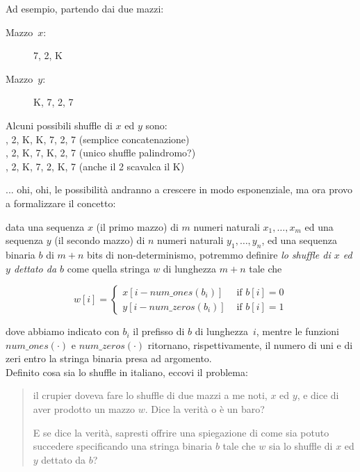   \begin{minipage}[t]{.40\textwidth}
    Ad esempio, partendo dai due mazzi:
    \begin{description}
      \item[{\sc Mazzo~$x$:}] 7, 2, K
      \vspace{-2mm}
      \item[{\sc Mazzo~$y$:}] K, 7, 2, 7
    \end{description}
  \end{minipage}%
\hspace{16.0mm}%
  \begin{minipage}[t]{.45\textwidth} 
    Alcuni possibili shuffle di $x$ ed $y$ sono:\\
    , 2, K, K, 7, 2, 7 (semplice concatenazione)\\
    , 2, K, 7, K, 2, 7 (unico shuffle palindromo?)\\
    , 2, K, 7, 2, K, 7 (anche il 2 scavalca il K)\\
  \end{minipage}

... ohi, ohi, le possibilità andranno a crescere in modo esponenziale,
ma ora provo a formalizzare il concetto:

data una sequenza $x$ (il primo mazzo)
di $m$ numeri naturali $x_1, \ldots, x_m$
ed una sequenza $y$ (il secondo mazzo)
di $n$ numeri naturali $y_1, \ldots, y_n$,
ed una sequenza binaria $b$ di $m+n$ bits di non-determinismo,
potremmo definire \emph{lo shuffle di $x$ ed $y$ dettato da $b$}
come quella stringa $w$ di lunghezza $m+n$ tale che

\[
w[i] = \left\{
         \begin{array}{ll}
          x[i- num\_ones(b_i)] & \mbox{ if $b[i]=0$} \\
          y[i- num\_zeros(b_i)] & \mbox{ if $b[i]=1$}
         \end{array}
       \right.
\]

dove abbiamo indicato con $b_i$ il prefisso di $b$ di lunghezza~$i$,
mentre le funzioni $num\_ones(\cdot)$ e $num\_zeros(\cdot)$
ritornano, rispettivamente, il numero di uni e di zeri entro la stringa binaria presa ad argomento.\\

\noindent
Definito cosa sia lo shuffle in italiano, eccovi il problema:

\begin{quote}
  il crupier doveva fare lo shuffle di due mazzi a me noti, $x$ ed $y$, e dice di aver prodotto un mazzo $w$. Dice la verità o è un baro?
  
  E se dice la verità, sapresti offrire una spiegazione di come sia potuto succedere specificando
  una stringa binaria $b$ tale che $w$ sia lo shuffle di $x$ ed $y$ dettato da $b$?
\end{quote}

